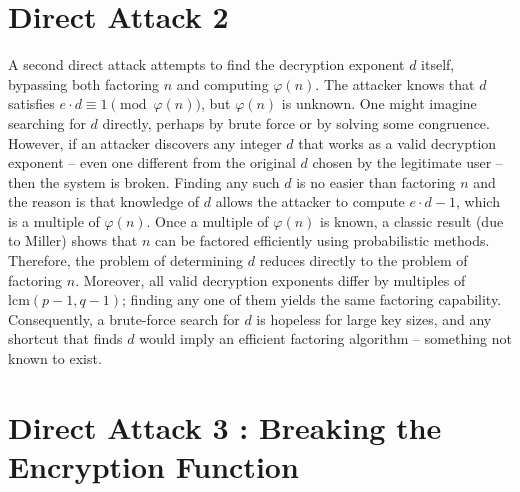 \section{Direct Attack 2}

A second direct attack attempts to find the decryption exponent \(d\) itself, bypassing both factoring \(n\) and computing \(\varphi(n)\). The attacker knows that \(d\) satisfies \(e \cdot d \equiv 1 \pmod{\varphi(n)}\), but \(\varphi(n)\) is unknown. One might imagine searching for \(d\) directly, perhaps by brute force or by solving some congruence. However, if an attacker discovers any integer \(d\) that works as a valid decryption exponent – even one different from the original \(d\) chosen by the legitimate user – then the system is broken. Finding any such \(d\) is no easier than factoring \(n\) and the reason is that knowledge of \(d\) allows the attacker to compute \(e \cdot d - 1\), which is a multiple of \(\varphi(n)\). Once a multiple of \(\varphi(n)\) is known, a classic result (due to Miller) shows that \(n\) can be factored efficiently using probabilistic methods. Therefore, the problem of determining \(d\) reduces directly to the problem of factoring \(n\). Moreover, all valid decryption exponents differ by multiples of \(\mathrm{lcm}(p-1, q-1)\); finding any one of them yields the same factoring capability. Consequently, a brute-force search for \(d\) is hopeless for large key sizes, and any shortcut that finds \(d\) would imply an efficient factoring algorithm – something not known to exist.

\section{Direct Attack 3 : Breaking the Encryption Function}

